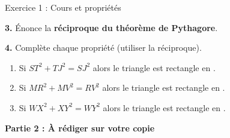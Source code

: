 \begin{exercisebox}{ Exercice 1 : Cours et propriétés }
	\smallspace
	
	\textbf{3.} Énonce la \textbf{réciproque du théorème de Pythagore}. 
	
	
	\smallspace
	
	\textbf{4.} Complète chaque propriété (utiliser la réciproque). 
	\begin{enumerate}[label=\alph*)]
		\item Si $ST^2 + TJ^2 = SJ^2$ alors le triangle \onlyeleve{\underline{\hspace{1.6cm}}}  est rectangle en \onlyeleve{\underline{\hspace{1cm}}} .
		\item Si $MR^2 + MV^2 = RV^2$ alors le triangle \onlyeleve{\underline{\hspace{1.6cm}}}  est rectangle en \onlyeleve{\underline{\hspace{1cm}}} .
		\item Si $WX^2 + XY^2 = WY^2$ alors le triangle \onlyeleve{\underline{\hspace{1.6cm}}}  est rectangle en \onlyeleve{\underline{\hspace{1cm}}} .
	\end{enumerate}
\end{exercisebox}


\newpage %


\begin{center}
	\Large\textbf{Partie 2 : À rédiger sur votre copie}
\end{center}
\vspace{2mm}

